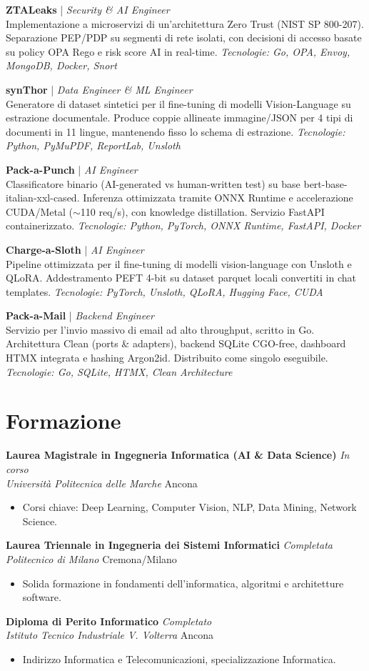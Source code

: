 \documentclass[a4paper,10pt]{article}
\newcommand{\cventry}[4]{
  \noindent\textbf{#1} \hfill \textit{#2}\\
  \textit{#3} \hfill #4\vspace{0.3em}
}
\newcommand{\projectentry}[3]{
  \noindent\textbf{#1} | \textit{#2}\\
  #3\vspace{0.3em}
}
\begin{document}
\projectentry{ZTALeaks}{Security \& AI Engineer}{Implementazione a microservizi di un'architettura Zero Trust (NIST SP 800-207). Separazione PEP/PDP su segmenti di rete isolati, con decisioni di accesso basate su policy OPA Rego e risk score AI in real-time. \textit{Tecnologie: Go, OPA, Envoy, MongoDB, Docker, Snort}}

\projectentry{synThor}{Data Engineer \& ML Engineer}{Generatore di dataset sintetici per il fine-tuning di modelli Vision-Language su estrazione documentale. Produce coppie allineate immagine/JSON per 4 tipi di documenti in 11 lingue, mantenendo fisso lo schema di estrazione. \textit{Tecnologie: Python, PyMuPDF, ReportLab, Unsloth}}

\projectentry{Pack-a-Punch}{AI Engineer}{Classificatore binario (AI-generated vs human-written test) su base bert-base-italian-xxl-cased. Inferenza ottimizzata tramite ONNX Runtime e accelerazione CUDA/Metal ($\sim$110 req/s), con knowledge distillation. Servizio FastAPI containerizzato. \textit{Tecnologie: Python, PyTorch, ONNX Runtime, FastAPI, Docker}}

\projectentry{Charge-a-Sloth}{AI Engineer}{Pipeline ottimizzata per il fine-tuning di modelli vision-language con Unsloth e QLoRA. Addestramento PEFT 4-bit su dataset parquet locali convertiti in chat templates. \textit{Tecnologie: PyTorch, Unsloth, QLoRA, Hugging Face, CUDA}}

\projectentry{Pack-a-Mail}{Backend Engineer}{Servizio per l'invio massivo di email ad alto throughput, scritto in Go. Architettura Clean (ports \& adapters), backend SQLite CGO-free, dashboard HTMX integrata e hashing Argon2id. Distribuito come singolo eseguibile. \textit{Tecnologie: Go, SQLite, HTMX, Clean Architecture}}

\section{Formazione}
\cventry{Laurea Magistrale in Ingegneria Informatica (AI \& Data Science)}{In corso}{Università Politecnica delle Marche}{Ancona}
\vspace{-0.5em}
\begin{itemize}[leftmargin=1.5em, itemsep=0pt, topsep=0pt]
  \item Corsi chiave: Deep Learning, Computer Vision, NLP, Data Mining, Network Science.
\end{itemize}

\vspace{0.5em}
\cventry{Laurea Triennale in Ingegneria dei Sistemi Informatici}{Completata}{Politecnico di Milano}{Cremona/Milano}
\vspace{-0.5em}
\begin{itemize}[leftmargin=1.5em, itemsep=0pt, topsep=0pt]
  \item Solida formazione in fondamenti dell'informatica, algoritmi e architetture software.
\end{itemize}

\vspace{0.5em}
\cventry{Diploma di Perito Informatico}{Completato}{Istituto Tecnico Industriale V. Volterra}{Ancona}
\vspace{-0.5em}
\begin{itemize}[leftmargin=1.5em, itemsep=0pt, topsep=0pt]
  \item Indirizzo Informatica e Telecomunicazioni, specializzazione Informatica.
\end{itemize}
\end{document}
